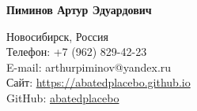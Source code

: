 \documentclass[12pt,a4paper]{article}
\begin{document}
\newcommand{\name}[1]{\textbf{#1}} 
\newcommand{\address}[1]{#1\\} 
\newcommand{\phone}[1]{Телефон: #1\\} 
\newcommand{\email}[1]{E-mail: #1\\}
\newcommand{\website}[1]{Сайт: \url{#1}\\} 
\newcommand{\github}[1]{GitHub: \href{https://github.com/#1}{#1}\\} 


\pagestyle{empty}
\thispagestyle{empty}

\begin{center} 
\vspace*{-2cm} 
\name{Пиминов Артур Эдуардович} 
\end{center}
\address{Новосибирск, Россия}
\phone{+7 (962) 829-42-23} 
\email{arthurpiminov@yandex.ru} 
\website{https://abatedplacebo.github.io} 
\github{abatedplacebo} 
\vspace{0.5cm}
\end{document}
